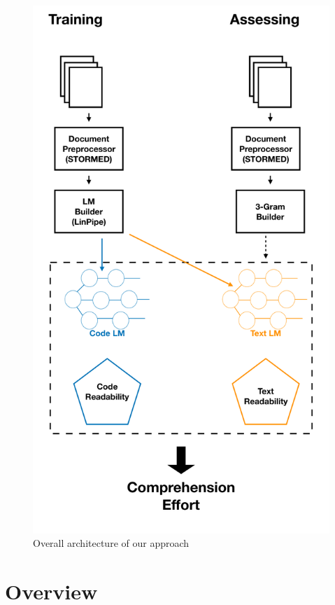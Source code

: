 \documentclass[12pt,mscthesis]{usiinfthesis}
\begin{document}
	\begin{figure}[htbp]
	\centering
	\includegraphics[width=12cm, height=\textheight]{overview}
	\caption{Overall architecture of our approach}
	\label{overview}
	\end{figure}
	\newpage
\section{Overview}
\end{document}
